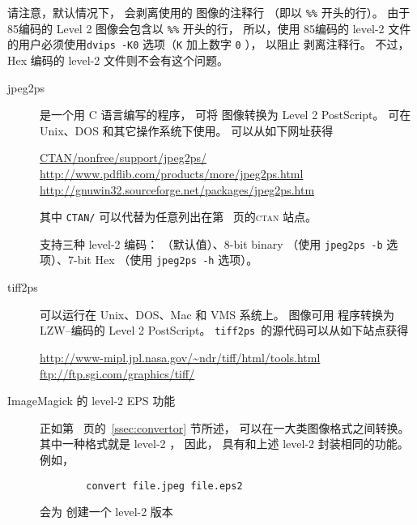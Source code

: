 请注意，默认情况下， 会剥离使用的  图像的注释行
（即以 \texttt{\%\%} 开头的行）。
由于\ascii85编码的 Level 2 图像会包含以 \texttt{\%\%} 开头的行，
所以，使用 \ascii85编码的 level-2  文件的用户必须使用\verb|dvips -K0| 选项（\texttt{K} 加上数字 \texttt{0} ），
以阻止  剥离注释行。
不过，\ascii Hex 编码的 level-2 文件则不会有这个问题。

\begin{description}
	\item[jpeg2ps] 
	
	 是一个用 C 语言编写的程序，
	可将 图像转换为 Level 2 PostScript。
	 可在 Unix、DOS 和其它操作系统下使用。
	 可以从如下网址获得
	\begin{center}
		\href{ftp://ctan.tug.org/tex-archive/nonfree/support/jpeg2ps/}{CTAN/nonfree/support/jpeg2ps/}\\
		\url{http://www.pdflib.com/products/more/jpeg2ps.html}\\
		\url{http://gnuwin32.sourceforge.net/packages/jpeg2ps.htm}
	\end{center}
	其中 \texttt{CTAN/} 可以代替为任意列出在第~\pageref{ctan-sites} 页的\textsc{ctan} 站点。
	
	 支持三种 level-2 编码：
	 （默认值）、8-bit binary （使用 \verb|jpeg2ps -b| 选项）、7-bit \ascii Hex （使用 \verb|jpeg2ps -h| 选项）。

	\item[tiff2ps]
	
	 可以运行在 Unix、DOS、Mac 和 VMS 系统上。
	 图像可用 程序转换为 LZW--编码的 Level 2 PostScript。
	\texttt{tiff2ps}~的源代码可以从如下站点获得
	\begin{center}
		\url{http://www-mipl.jpl.nasa.gov/~ndr/tiff/html/tools.html}\\
		\url{ftp://ftp.sgi.com/graphics/tiff/}
	\end{center}
	
	\item[ImageMagick 的 level-2 EPS 功能]
	
	正如第~\pageref{ssec:convertor} 页的~\ref{ssec:convertor} 节所述，
	 可以在一大类图像格式之间转换。
	其中一种格式就是 level-2 ，
	因此， 具有和上述 level-2 封装相同的功能。
	例如，
\begin{verbatim}
		convert file.jpeg file.eps2
\end{verbatim}
	会为  创建一个 level-2  版本 
	
\end{description}

